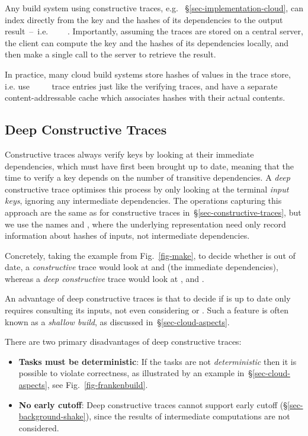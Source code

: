 Any  build system using constructive traces, e.g.
\CloudBuild~\S\ref{sec-implementation-cloud}, can index directly from the
key and the hashes of its dependencies to the output result~--~i.e.
~~\hs{[Hash}~\hs{v])}~. Importantly, assuming the traces
are stored on a central server, the client can compute the key and the hashes of
its dependencies locally, and then make a single call to the server to retrieve
the result.

In practice, many cloud build systems store hashes of values in the trace store,
i.e. use ~~~~ trace entries just like the
verifying traces, and have a separate content-addressable cache which associates
hashes with their actual contents.

\subsection{Deep Constructive Traces}\label{sec-deep-constructive-traces}

Constructive traces always verify keys by looking at their immediate
dependencies, which must have first been brought up to date, meaning that the
time to verify a key depends on the number of transitive dependencies. A
\emph{deep} constructive trace optimises this process by only looking at the
terminal \emph{input keys}, ignoring any intermediate dependencies. The operations
capturing this approach are the same as for constructive traces
in~\S\ref{sec-constructive-traces}, but we use the names  and
, where the underlying  representation need only record
information about hashes of inputs, not intermediate dependencies.

Concretely, taking the example from Fig.~\ref{fig-make}, to decide whether
 is out of date, a \emph{constructive} trace would look at
 and  (the immediate dependencies), whereas a
\emph{deep constructive} trace would look at ,  and
.

An advantage of deep constructive traces is that to decide if  is
up to date only requires consulting its inputs, not even considering
 or . Such a feature is often known as a
\emph{shallow build}, as discussed in~\S\ref{sec-cloud-aspects}.

There are two primary disadvantages of deep constructive traces:

\begin{itemize}
  \item \textbf{Tasks must be deterministic}: If the tasks are not
        \emph{deterministic} then it is possible to violate correctness, as
        illustrated by an example in~\S\ref{sec-cloud-aspects}, see
        Fig.~\ref{fig-frankenbuild}.
  \item \textbf{No early cutoff}: Deep constructive traces cannot support early
        cutoff (\S\ref{sec-background-shake}), since the results of intermediate
        computations are not considered.
\end{itemize}

